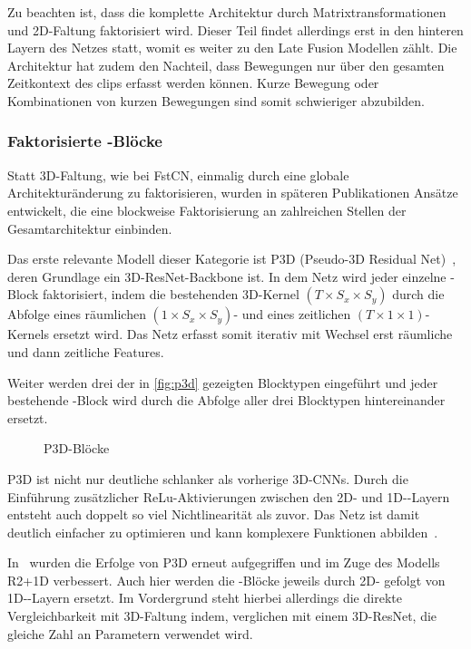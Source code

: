 Zu beachten ist, dass die komplette Architektur durch Matrixtransformationen und 2D-Faltung faktorisiert wird.
Dieser Teil findet allerdings erst in den hinteren Layern des Netzes statt, womit es weiter zu den Late Fusion Modellen zählt.
Die Architektur hat zudem den Nachteil, dass Bewegungen nur über den gesamten Zeitkontext des \glspl{clip} erfasst werden können.
Kurze Bewegung oder Kombinationen von kurzen Bewegungen sind somit schwieriger abzubilden.

\subsubsection{Faktorisierte \conv-Blöcke}


Statt 3D-Faltung, wie bei FstCN, einmalig durch eine globale Architekturänderung zu faktorisieren, wurden in späteren Publikationen Ansätze entwickelt, die eine blockweise Faktorisierung an zahlreichen Stellen der Gesamtarchitektur einbinden.

Das erste relevante Modell dieser Kategorie ist P3D (Pseudo-3D Residual Net)~\cite{Qiu17}, deren Grundlage ein 3D-ResNet-Backbone ist.
In dem Netz wird jeder einzelne \res-Block faktorisiert, indem die bestehenden 3D-Kernel $(T \times S_x \times S_y)$ durch die Abfolge eines räumlichen $(1 \times S_x \times S_y)$- und eines zeitlichen $(T \times 1 \times 1)$-Kernels ersetzt wird.
Das Netz erfasst somit iterativ mit Wechsel erst räumliche und dann zeitliche Features.

Weiter werden drei der in \autoref{fig:p3d} gezeigten Blocktypen eingeführt und jeder bestehende \res-Block wird durch die Abfolge aller drei Blocktypen hintereinander ersetzt.

\begin{figure}[h!]
    \centering
    \caption{P3D-Blöcke}
    \label{fig:p3d}
\end{figure}

P3D ist nicht nur deutliche schlanker als vorherige 3D-CNNs.
Durch die Einführung zusätzlicher ReLu-Aktivierungen zwischen den 2D- und 1D-\conv-Layern entsteht auch doppelt so viel Nichtlinearität als zuvor.
Das Netz ist damit deutlich einfacher zu optimieren und kann komplexere Funktionen abbilden~\cite{Tran18}.

In~\cite{Tran18} wurden die Erfolge von P3D erneut aufgegriffen und im Zuge des Modells R2+1D verbessert.
Auch hier werden die \res-Blöcke jeweils durch 2D- gefolgt von 1D-\conv-Layern ersetzt.
Im Vordergrund steht hierbei allerdings die direkte Vergleichbarkeit mit 3D-Faltung indem, verglichen mit einem 3D-ResNet, die gleiche Zahl an Parametern verwendet wird.

